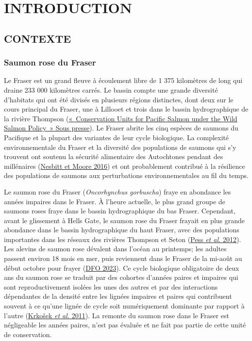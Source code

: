 \documentclass[french,11pt]{book}
\begin{document}
\renewcommand{\tablename}{Tableau}
\frontmatter

\hypertarget{introduction}{%
\section{INTRODUCTION}\label{introduction}}

\hypertarget{contexte}{%
\subsection{CONTEXTE}\label{contexte}}

\hypertarget{saumon-rose-du-fraser}{%
\subsubsection{Saumon rose du Fraser}\label{saumon-rose-du-fraser}}

Le Fraser est un grand fleuve à écoulement libre de 1 375 kilomètres de long qui draine 233 000 kilomètres carrés. Le bassin compte une grande diversité d'habitats qui ont été divisés en plusieurs régions distinctes, dont deux sur le cours principal du Fraser, une à Lillooet et trois dans le bassin hydrographique de la rivière Thompson (\protect\hyperlink{ref-holtbyConservationUnitsPacific2008}{{«~Conservation {Units} for {Pacific Salmon} under the {W}ild {S}almon {P}olicy~»} Sous presse}). Le Fraser abrite les cinq espèces de saumons du Pacifique et la plupart des variantes de leur cycle biologique. La complexité environnementale du Fraser et la diversité des populations de saumons qui s'y trouvent ont soutenu la sécurité alimentaire des Autochtones pendant des millénaires (\protect\hyperlink{ref-nesbittSpeciesPopulationDiversity2016}{Nesbitt et Moore 2016}) et ont probablement contribué à la résilience des populations de saumons aux perturbations environnementales au fil du temps.

Le saumon rose du Fraser (\emph{Oncorhynchus gorbuscha}) fraye en abondance les années impaires dans le Fraser. À l'heure actuelle, le plus grand groupe de saumons roses fraye dans le bassin hydrographique du bas Fraser. Cependant, avant le glissement à Hells Gate, le saumon rose du Fraser frayait en plus grande abondance dans le bassin hydrographique du haut Fraser, avec des populations importantes dans les réseaux des rivières Thompson et Seton (\protect\hyperlink{ref-pessInfluencePopulationDynamics2012}{Pess \emph{et al.} 2012}). Les alevins de saumon rose dévalent dans l'océan au printemps; les adultes passent environ 18 mois en mer, puis reviennent dans le Fraser de la mi-août au début octobre pour frayer (\protect\hyperlink{ref-dfoSouthernSalmonIntegrated2023}{DFO 2023}). Ce cycle biologique obligatoire de deux ans du saumon rose se traduit par des cohortes d'années paires et impaires qui sont reproductivement isolées les unes des autres et par des interactions dépendantes de la densité entre les lignées impaires et paires qui contribuent souvent à ce qu'une lignée de cycle soit numériquement dominante par rapport à l'autre (\protect\hyperlink{ref-krkosek2011cycles}{Krkošek \emph{et al.} 2011}). La remonte du saumon rose dans le Fraser est négligeable les années paires, n'est pas évaluée et ne fait pas partie de cette unité de conservation.
\end{document}
